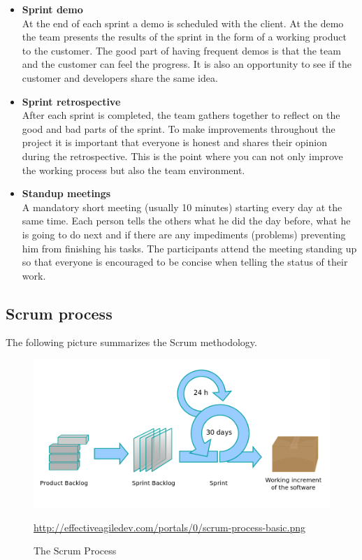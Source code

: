 \begin{itemize}
\item{\textbf{Sprint demo}}\\
At the end of each sprint a demo is scheduled with the client. At the demo the team presents the results of the sprint 
in the form of a working product to the customer. The good part of having frequent demos is that the team and the customer can
feel the progress. It is also an opportunity to see if the customer and developers share the same idea.

\item{\textbf{Sprint retrospective}}\\
After each sprint is completed, the team gathers together to reflect on the good and bad parts of the sprint.
To make improvements throughout the project it is important that everyone is honest and shares their opinion during the retrospective.
This is the point where you can not only improve the working process but also the team environment.

\item{\textbf{Standup meetings}}\\
A mandatory short meeting (usually 10 minutes) starting every day at the same time.
Each person tells the others what he did the day before, what he is going to do
next and if there are any impediments (problems) preventing him from finishing his tasks. The participants attend the meeting standing up so that everyone is encouraged to be concise
when telling the status of their work.

\end{itemize}
\pagebreak

\subsection{Scrum process}
The following picture summarizes the Scrum methodology.

\begin{figure}[!h]
\centering
\includegraphics[scale=0.35]{graphics/scrum.png}
\caption{The Scrum Process}\label{fig:scrum_process}
\url{http://effectiveagiledev.com/portals/0/scrum-process-basic.png}
\end{figure}
